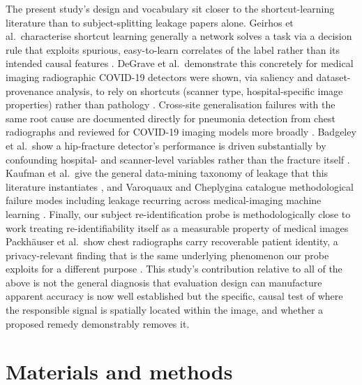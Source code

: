 \documentclass[3p,final,10pt]{elsarticle}
\let\oldsection\section
\renewcommand{\section}{\FloatBarrier\oldsection}
\begin{document}
The present study's design and vocabulary sit closer to the
shortcut-learning literature than to subject-splitting leakage
papers alone. Geirhos et al.\ characterise shortcut learning generally a
network solves a task via a decision rule that exploits spurious,
easy-to-learn correlates of the label rather than its intended causal
features \cite{geirhos2020}. DeGrave et al.\ demonstrate this concretely
for medical imaging radiographic COVID-19 detectors were shown, via
saliency and dataset-provenance analysis, to rely on shortcuts (scanner
type, hospital-specific image properties) rather than pathology
\cite{degrave2021}. Cross-site generalisation failures with the same root
cause are documented directly for pneumonia detection from chest
radiographs \cite{zech2018} and reviewed for COVID-19 imaging models more
broadly \cite{roberts2021}. Badgeley et al.\ show a hip-fracture detector's
performance is driven substantially by confounding hospital- and
scanner-level variables rather than the fracture itself
\cite{badgeley2019}. Kaufman et al.\ give the general data-mining taxonomy
of leakage that this literature instantiates \cite{kaufman2012}, and
Varoquaux and Cheplygina catalogue methodological failure modes
including leakage recurring across medical-imaging machine learning
\cite{varoquaux2022}. Finally, our subject re-identification probe is
methodologically close to work treating re-identifiability itself as a
measurable property of medical images Packh\"auser et al.\ show chest
radiographs carry recoverable patient identity, a privacy-relevant finding
that is the same underlying phenomenon our probe exploits for a different
purpose \cite{packhauser2022}. This study's contribution relative to all
of the above is not the general diagnosis that evaluation design can
manufacture apparent accuracy is now well established but the specific,
causal test of where the responsible signal is spatially located
within the image, and whether a proposed remedy demonstrably removes it.

\section{Materials and methods}
\end{document}
